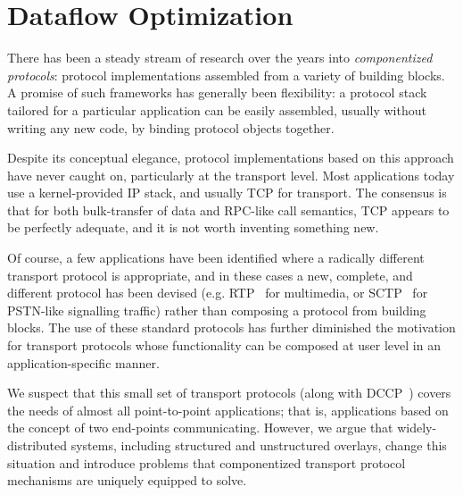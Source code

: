 \chapter[Dataflow Optimization]{Dataflow Optimization}
\label{ch:dataflow}


There has been a steady stream of research over the years into
\emph{componentized protocols}: protocol 
implementations assembled from a variety of building blocks.  A 
promise of such frameworks has generally been
flexibility: a protocol stack tailored for a particular application
can be easily assembled, usually without writing any new code, by
binding protocol objects together. 


Despite its conceptual elegance, protocol
implementations based on this approach have never
caught on, particularly at the transport level.  Most
applications today use a
kernel-provided IP stack, and usually TCP for transport.  The consensus is that 
for both bulk-transfer of data and RPC-like call semantics, TCP appears to be
perfectly adequate, and it is not worth inventing something new.


Of course, a few applications have been identified where a radically different
transport protocol is appropriate, and in these cases a
new, complete, and different protocol has been devised
(e.g. RTP~\cite{rfc:1889}  for multimedia, or SCTP~\cite{rfc:2960}
for PSTN-like signalling traffic) rather than composing a protocol
from building blocks.  The use of these standard protocols has further
diminished the motivation for  transport protocols whose functionality
can be composed at user level in an application-specific manner.  


We suspect that this small set of transport protocols (along with
DCCP~\cite{dccp-problem}) covers the needs of almost all
point-to-point applications; that is, applications based on the
concept of two end-points communicating. 
However, we argue that widely-distributed systems,
including structured and unstructured overlays, change this situation
and introduce problems that componentized transport protocol
mechanisms are uniquely equipped to solve.  

